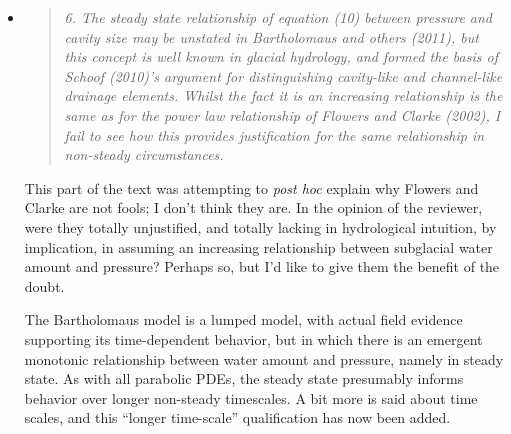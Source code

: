 \documentclass[11pt,reqno]{amsart}
\newcommand{\reply}[2]{
\medskip\medskip
\item  \begin{quote}
\emph{#1}
\end{quote}

\medskip
\noindent #2}
\begin{document}
\begin{itemize}
{Note that (4) is conservation of mass.  In a full cavity model, both equations (4) and (9) must be solved simultaneously, given that $(A_c,P)$ are the state variables.}

\reply{6. The steady state relationship of equation (10) between pressure and cavity size may be unstated in Bartholomaus and others (2011), but this concept is well known in glacial hydrology, and formed the basis of Schoof (2010)'s argument for distinguishing cavity-like and channel-like drainage elements. Whilst the fact it is an increasing relationship is the same as for the power law relationship of Flowers and Clarke (2002), I fail to see how this provides justification for the same relationship in non-steady circumstances.}
{This part of the text was attempting to \emph{post hoc} explain why Flowers and Clarke are not fools; I don't think they are.  In the opinion of the reviewer, were they totally unjustified, and totally lacking in hydrological intuition, by implication, in assuming an increasing relationship between subglacial water amount and pressure?  Perhaps so, but I'd like to give them the benefit of the doubt.

The Bartholomaus model is a lumped model, with actual field evidence supporting its time-dependent behavior, but in which there is an emergent monotonic relationship between water amount and pressure, namely in steady state.  As with all parabolic PDEs, the steady state presumably informs behavior over longer non-steady timescales.  A bit more is said about time scales, and this ``longer time-scale'' qualification has now been added.}
\end{itemize}
\end{document}
